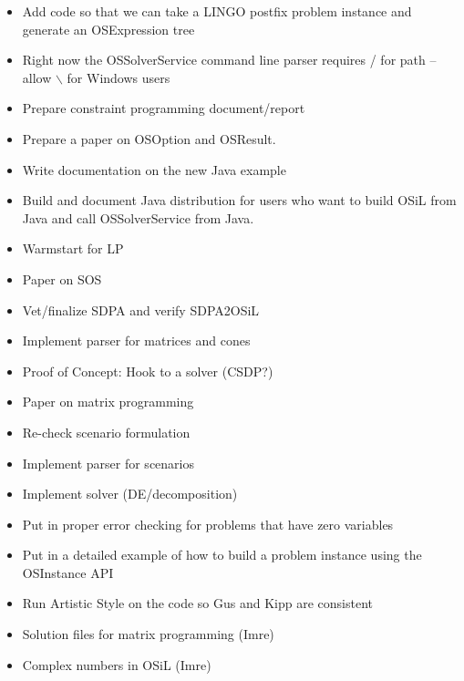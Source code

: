 \begin{itemize}
\item Add code so that we can take a LINGO postfix problem instance and generate an OSExpression tree

\item Right now the OSSolverService command line parser requires / for path -- allow {$\backslash$} for Windows users

\item Prepare constraint programming document/report

\item Prepare a paper on OSOption and OSResult.

\item Write documentation on the new Java example 

\item Build and document Java distribution for users who want to build OSiL from Java and 
call OSSolverService from Java. 

\item Warmstart for LP

\item Paper on SOS

\item Vet/finalize SDPA and verify SDPA2OSiL

\item Implement parser for matrices and cones

\item Proof of Concept: Hook to a solver (CSDP?)

\item Paper on matrix programming

\item Re-check scenario formulation

\item Implement parser for scenarios

\item Implement solver (DE/decomposition)

\item Put in proper error checking for problems that have zero variables

\item Put in a detailed example of how to build a problem instance using the OSInstance API

\item Run Artistic Style on the code so Gus and Kipp are consistent

\item Solution files for matrix programming (Imre)

\item Complex numbers in OSiL (Imre)

\end{itemize}
